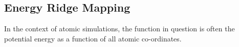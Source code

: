 \subsection{Energy Ridge Mapping}
\label{sec:energy-ridge-mapping}

In the context of atomic simulations, the function in question is often the potential energy as a function of all atomic co-ordinates.

\incomplete
